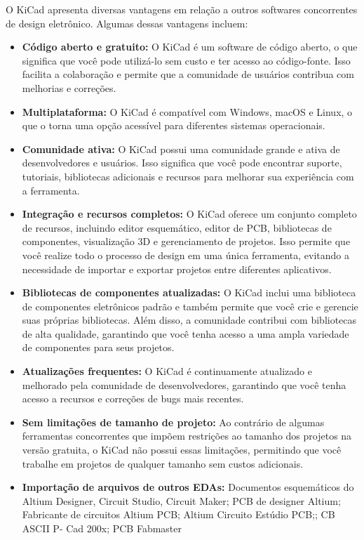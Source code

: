 O KiCad apresenta diversas vantagens em relação a outros softwares concorrentes de design eletrônico. Algumas dessas vantagens incluem:

\begin{itemize}
\item
  \textbf{Código aberto e gratuito:} O KiCad é um software de código aberto, o que significa que você pode utilizá-lo sem custo e ter acesso ao código-fonte. Isso facilita a colaboração e permite que a comunidade de usuários contribua com melhorias e correções.
\item
  \textbf{Multiplataforma:} O KiCad é compatível com Windows, macOS e Linux, o que o torna uma opção acessível para diferentes sistemas operacionais.
\item
  \textbf{Comunidade ativa:} O KiCad possui uma comunidade grande e ativa de desenvolvedores e usuários. Isso significa que você pode encontrar suporte, tutoriais, bibliotecas adicionais e recursos para melhorar sua experiência com a ferramenta.
\item
  \textbf{Integração e recursos completos:} O KiCad oferece um conjunto completo de recursos, incluindo editor esquemático, editor de PCB, bibliotecas de componentes, visualização 3D e gerenciamento de projetos. Isso permite que você realize todo o processo de design em uma única ferramenta, evitando a necessidade de importar e exportar projetos entre diferentes aplicativos.
\item
  \textbf{Bibliotecas de componentes atualizadas:} O KiCad inclui uma biblioteca de componentes eletrônicos padrão e também permite que você crie e gerencie suas próprias bibliotecas. Além disso, a comunidade contribui com bibliotecas de alta qualidade, garantindo que você tenha acesso a uma ampla variedade de componentes para seus projetos.
\item
  \textbf{Atualizações frequentes:} O KiCad é continuamente atualizado e melhorado pela comunidade de desenvolvedores, garantindo que você tenha acesso a recursos e correções de bugs mais recentes.
\item
  \textbf{Sem limitações de tamanho de projeto:} Ao contrário de algumas ferramentas concorrentes que impõem restrições ao tamanho dos projetos na versão gratuita, o KiCad não possui essas limitações, permitindo que você trabalhe em projetos de qualquer tamanho sem custos adicionais.
\item
  \textbf{Importação de arquivos de outros EDAs:} Documentos esquemáticos do Altium Designer, Circuit Studio, Circuit Maker; PCB de designer Altium; Fabricante de circuitos Altium PCB; Altium Circuito Estúdio PCB;; CB ASCII P- Cad 200x; PCB Fabmaster
\end{itemize}

